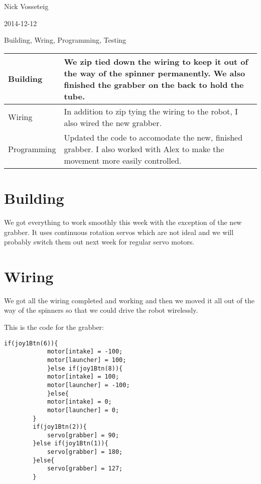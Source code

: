 Nick Vosseteig

2014-12-12

Building, Wring, Programming, Testing

\begin{tabular}{|p{5cm}|p{5cm}|}
 \hline
 Building&
We zip tied down the wiring to keep it out of the way of the spinner permanently. We also finished the grabber on the back to hold the tube. 
 \\
 \hline
Wiring&
In addition to zip tying the wiring to the robot, I also wired the new grabber. 
 \\
 \hline
Programming&
Updated the code to accomodate the new, finished grabber. I also worked with Alex to make the movement more easily controlled.
 \\
 \hline
\end{tabular}

\section*{Building}
We got everything to work smoothly this week with the exception of the new grabber. It uses continuous rotation servos which are not ideal and we will probably switch them out next week for regular servo motors.
\section*{Wiring}
We got all the wiring completed and working and then we moved it all out of the way of the spinners so that we could drive the robot wirelessly.

This is the code for the grabber:
\begin{lstlisting}[style = RobotC]	
		if(joy1Btn(6)){
			motor[intake] = -100;
			motor[launcher] = 100;
			}else if(joy1Btn(8)){
			motor[intake] = 100;
			motor[launcher] = -100;
			}else{
			motor[intake] = 0;
			motor[launcher] = 0;
		}
		if(joy1Btn(2)){
			servo[grabber] = 90;
		}else if(joy1Btn(1)){
			servo[grabber] = 180;
		}else{
			servo[grabber] = 127;
		}
\end{lstlisting}
